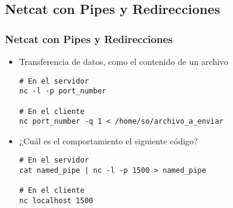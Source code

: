 \subsection{Netcat con Pipes y Redirecciones}
\begin{frame}[fragile]
  \frametitle{Netcat con Pipes y Redirecciones}
  \begin{itemize}
    \item Transferencia de datos, como el contenido de un archivo
      \begin{lstlisting}
# En el servidor      
nc -l -p port_number

# En el cliente
nc port_number -q 1 < /home/so/archivo_a_enviar
      \end{lstlisting}      
    \item ¿Cuál es el comportamiento el siguiente código?
      \begin{lstlisting}
# En el servidor
cat named_pipe | nc -l -p 1500 > named_pipe

# En el cliente
nc localhost 1500
      \end{lstlisting}
  \end{itemize}
\end{frame}